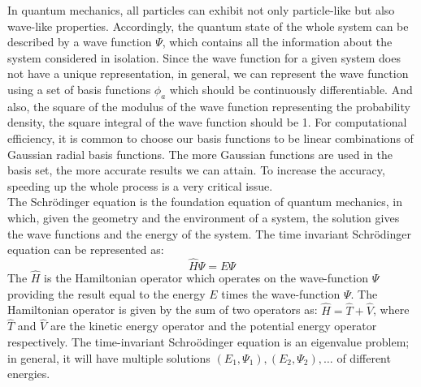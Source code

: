 \documentclass[twoside]{article}
\begin{document}
In quantum mechanics, all particles can exhibit not only particle-like but also wave-like properties. Accordingly, the quantum state of the whole system can be described by a wave function $\Psi$, which contains all the information about the system considered in isolation. Since the wave function for a given system does not have a unique representation, in general, we can represent the wave function using a set of basis functions $\phi_a$ which should be continuously differentiable. And also, the square of the modulus of the wave function representing the probability density, the square integral of the wave function should be 1.
For computational efficiency, it is common to choose our basis functions to be linear combinations of Gaussian radial basis functions.
The more Gaussian functions are used in the basis set, the more accurate results we can attain. To increase the accuracy, speeding up the whole process is a very critical issue. \\






The Schr\"{o}dinger equation is the foundation equation of quantum mechanics, in which, given the geometry and the environment of a system, the solution gives the wave functions and the energy of the system. 
The time invariant Schr\"{o}dinger equation can be represented as:
\[
				\hat{H}\Psi = E\Psi
\]
The $\hat{H}$ is the Hamiltonian operator which operates on the wave-function $\Psi$ providing the result equal to the energy $E$ times the wave-function $\Psi$. The Hamiltonian operator is given by the sum of two operators as: $\hat{H} = \hat{T} + \hat{V}$,  where $\hat{T}$ and $\hat{V}$ are the kinetic energy operator and the potential energy operator respectively. 
The time-invariant Schro\"{o}dinger equation is an eigenvalue problem; in general, it will have multiple solutions $(E_1, \Psi_1), (E_2,\Psi_2), \ldots$ of different energies.  
\end{document}
